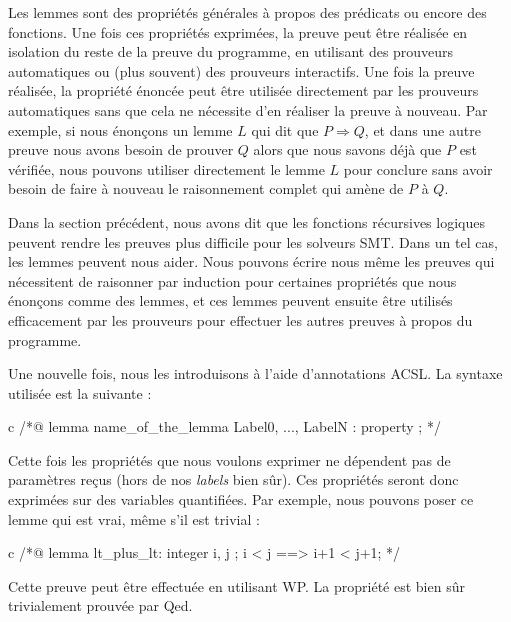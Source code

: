 
Les lemmes sont des propriétés générales à propos des prédicats ou encore des 
fonctions. Une fois ces propriétés exprimées, la preuve peut être réalisée en
isolation du reste de la preuve du programme, en utilisant des prouveurs 
automatiques ou (plus souvent) des prouveurs interactifs. Une fois la preuve
réalisée, la propriété énoncée peut être utilisée directement par les prouveurs
automatiques sans que cela ne nécessite d'en réaliser la preuve à nouveau. Par
exemple, si nous énonçons un lemme $L$ qui dit que $P \Rightarrow Q$, et dans
une autre preuve nous avons besoin de prouver $Q$ alors que nous savons déjà
que $P$ est vérifiée, nous pouvons utiliser directement le lemme $L$ pour
conclure sans avoir besoin de faire à nouveau le raisonnement complet qui
amène de $P$ à $Q$.



Dans la section précédent, nous avons dit que les fonctions récursives logiques
peuvent rendre les preuves plus difficile pour les solveurs SMT. Dans un tel cas,
les lemmes peuvent nous aider. Nous pouvons écrire nous même les preuves qui 
nécessitent de raisonner par induction pour certaines propriétés que nous
énonçons comme des lemmes, et ces lemmes peuvent ensuite être utilisés 
efficacement par les prouveurs pour effectuer les autres preuves à propos du
programme.




Une nouvelle fois, nous les introduisons à l'aide d'annotations ACSL. La syntaxe
utilisée est la suivante :



\begin{CodeBlock}{c}
/*@
  lemma name_of_the_lemma { Label0, ..., LabelN }:
    property ;
*/
\end{CodeBlock}



Cette fois les propriétés que nous voulons exprimer ne dépendent pas de 
paramètres reçus (hors de nos \textit{labels} bien sûr). Ces propriétés seront donc 
exprimées sur des variables quantifiées. Par exemple, nous pouvons poser ce 
lemme qui est vrai, même s'il est trivial :



\begin{CodeBlock}{c}
/*@
  lemma lt_plus_lt:
    \forall integer i, j ; i < j ==> i+1 < j+1;
*/
\end{CodeBlock}



Cette preuve peut être effectuée en utilisant WP. La propriété est bien sûr 
trivialement prouvée par Qed.



